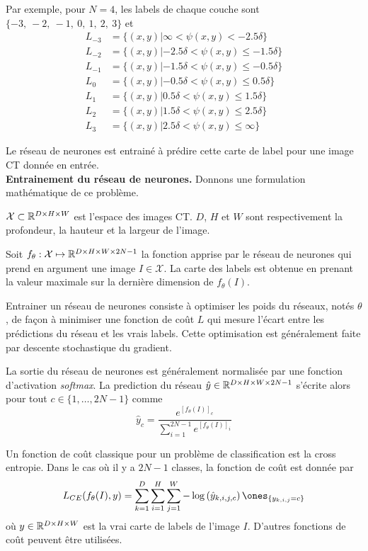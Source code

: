\documentclass[a4paper, 11pt]{article}
\begin{document}
Par exemple, pour $N=4$, les labels de chaque couche sont $\{-3,\ -2,\ -1,\ 0,\ 1,\ 2,\ 3\}$ et 
\begin{align*}
    L_{-3} &= \lbrace (x, y) | \infty < \psi(x, y) < -2.5 \delta \rbrace \\
    L_{-2} &= \lbrace (x, y) | -2.5 \delta < \psi(x, y) \leq -1.5 \delta \rbrace \\
    L_{-1} &= \lbrace (x, y) | -1.5 \delta < \psi(x, y) \leq -0.5 \delta \rbrace \\
    L_{0} &= \lbrace (x, y) | -0.5 \delta < \psi(x, y) \leq 0.5 \delta \rbrace \\
    L_{1} &= \lbrace (x, y) | 0.5 \delta < \psi(x, y) \leq 1.5 \delta \rbrace \\
    L_{2} &= \lbrace (x, y) | 1.5 \delta < \psi(x, y) \leq 2.5 \delta \rbrace \\
    L_{3} &= \lbrace (x, y) | 2.5 \delta < \psi(x, y) \leq \infty \rbrace
\end{align*}

Le réseau de neurones est entrainé à prédire cette carte de label pour une image CT donnée en entrée. \\ 

\textbf{Entrainement du réseau de neurones.} Donnons une formulation mathématique de ce problème. 

$\mathcal{X}\subset \mathbb{R}^{D\times H\times W} $ est l'espace des images CT. $D$, $H$ et $W$ sont respectivement la profondeur, la hauteur et la largeur de l'image. 

Soit $f_\theta : \mathcal{X} \mapsto \mathbb{R}^{D\times H\times W\times 2N-1}$ la fonction apprise par le réseau de neurones qui prend en argument une image $I\in\mathcal{X}$. La carte des labels est obtenue en prenant la valeur maximale sur la dernière dimension de $f_{\theta}(I)$.

Entrainer un réseau de neurones consiste à optimiser les poids du réseaux, notés $\theta$, de façon à minimiser une fonction de coût $L$ qui mesure l'écart entre les prédictions du réseau et les vrais labels. Cette optimisation est généralement faite par descente stochastique du gradient.

La sortie du réseau de neurones est généralement normalisée par une fonction d'activation \textit{softmax}. La prediction du réseau $\hat{y}\in\mathbb{R}^{D\times H\times W\times 2N-1}$ s'écrite alors pour tout $c\in\{1, \dots, 2N-1\}$ comme
$$
\hat{y}_c =  \frac{e^{[f_{\theta}(I)]_c}}{\sum_{i=1}^{2N-1} e^{[f_{\theta}(I)]_i}}
$$


Un fonction de coût classique pour un problème de classification est la cross entropie. Dans le cas où il y a $2N-1$ classes, la fonction de coût est donnée par
\begin{equation}
    L_{CE}(f_{\theta}(I), y) = \sum_{k=1}^{D}\sum_{i=1}^{H}\sum_{j=1}^{W} - \log\left(  \hat{y}_{k,i,j,c}\right) \ones_{\{y_{k,i,j} = c\}}
\end{equation}
où $y\in\mathbb{R}^{D\times H\times W}$ est la vrai carte de labels de l'image $I$. D'autres fonctions de coût peuvent être utilisées. \\ 
\end{document}
